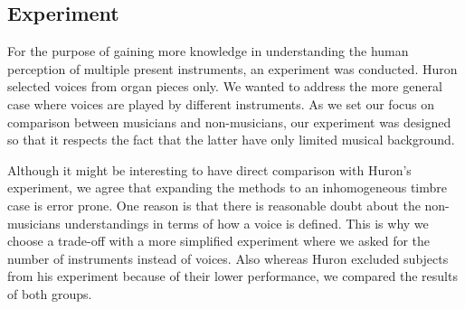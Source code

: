 \subsection{Experiment}
For the purpose of gaining more knowledge in understanding the human perception of multiple present instruments, an experiment was conducted. Huron selected voices from organ pieces only. We wanted to address the more general case where voices are played by different instruments.
As we set our focus on comparison between musicians and non-musicians, our experiment was designed so that it respects the fact that the latter have only limited musical background.
\par
Although it might be interesting to have direct comparison with Huron's experiment, we agree that expanding the methods to an inhomogeneous timbre case is error prone. One reason is that there is reasonable doubt about the non-musicians understandings in terms of how a voice is defined. This is why we choose a trade-off with a more simplified experiment where we asked for the number of instruments instead of voices. Also whereas Huron \cite{huron89}  excluded subjects from his experiment because of their lower performance, we compared the results of both groups.

